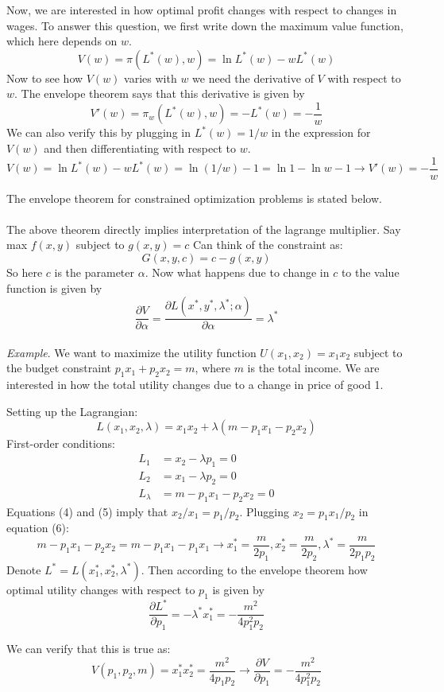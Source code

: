 \documentclass{./../../latex/handout}
\begin{document}
Now, we are interested in how optimal profit changes with respect to changes in wages. To answer this question, we first write down the maximum value function, which here depends on $w$. 
\[ V(w) = \pi(L^*(w), w) =  \ln L^*(w)-wL^*(w) \]
Now to see how $V(w)$ varies with $w$ we need the derivative of $V$ with respect to $w$. The envelope theorem says that this derivative is given by
\[ V'(w) =  \pi_w(L^*(w), w) =-L^*(w) = -\frac{1}{w}\]
We can also verify this by plugging in $L^*(w)=1/w$ in the expression for $V(w)$ and then differentiating with respect to $w$.
\[ V(w) =   \ln L^*(w)-wL^*(w) = \ln(1/w)-1 = \ln 1-\ln w-1 \rightarrow V'(w)=-\frac{1}{w}\] 

The envelope theorem for constrained optimization problems is stated below. \\

 \\

The above theorem directly implies interpretation of the lagrange multiplier. Say max $f(x, y)$ subject to $g(x, y)=c$ 
Can think of the constraint as:
\[ G(x,y,c)= c-g(x,y) \]
So here $c$ is the parameter $\alpha$. Now what happens due to change in $c$ to the value function is given by 
\[
\frac{\partial V}{\partial \alpha}=\frac{\partial L(x^*, y^*, \lambda^*; \alpha)}{\partial \alpha} = \lambda^*\] \\

\textit{Example}. We want to maximize the utility function $U(x_1,x_2)=x_1 x_2$ subject to the budget constraint $p_1 x_1 + p_2 x_2 = m$, where $m$ is the total income. We are interested in how the total utility changes due to a change in price of good 1. 

Setting up the Lagrangian: 
\[
L(x_1,x_2,\lambda) =x_1 x_2 + \lambda(m-p_1x_1-p_2x_2)
\]
First-order conditions:
\begin{align}
	L_{1} &= x_2-\lambda p_1=0 \\
	L_{2} &= x_1-\lambda p_2=0 \\
	L_{\lambda} &= m-p_1x_1-p_2x_2 = 0
\end{align}
Equations (4) and (5) imply that $x_2/x_1 = p_1/p_2$. Plugging $x_2 = p_1x_1/p_2$ in equation (6):
\[m-p_1x_1-p_2x_2 = m-p_1x_1-p_1x_1 \rightarrow x_1^*=\frac{m}{2p_1},x_2^*=\frac{m}{2p_2}, \lambda^* = \frac{m}{2p_1 p_2}  \]
Denote $L^*=L(x_1^*,x_2^*,\lambda^*)$. Then according to the envelope theorem how optimal utility changes with respect to $p_1$ is given by \[ \frac{\partial L^*}{\partial p_1} = -\lambda^* x_1^* = - \frac{m^2}{4p_1^2 p_2}\]

We can verify that this is true as:
\[ V(p_1,p_2,m) = x_1^* x_2^* = \frac{m^2}{4p_1 p_2} \rightarrow \frac{\partial V}{\partial p_1} = - \frac{m^2}{4p_1^2 p_2}\]
\end{document}
